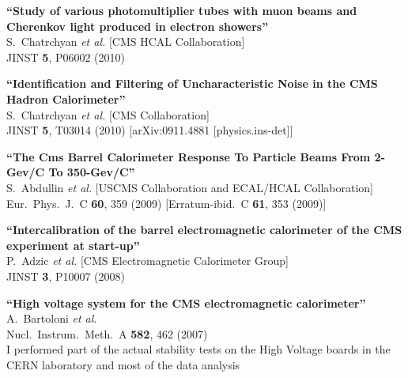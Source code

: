 \documentclass[10pt, a4paper]{article}
\begin{document}

\begin{thebibliography}{599}

{\bf ``Study of various photomultiplier tubes with muon beams and Cherenkov light produced in electron showers''}
  \\{}S.~Chatrchyan {\it et al.}  [CMS HCAL Collaboration]
  \\{}JINST {\bf 5}, P06002 (2010)

{\bf ``Identification and Filtering of Uncharacteristic Noise in the CMS Hadron Calorimeter''}
  \\{}S.~Chatrchyan {\it et al.}  [CMS Collaboration]
  \\{}JINST {\bf 5}, T03014 (2010)
  [arXiv:0911.4881 [physics.ins-det]]

{\bf ``The Cms Barrel Calorimeter Response To Particle Beams From 2-Gev/C To 350-Gev/C''}
  \\{}S.~Abdullin {\it et al.}  [USCMS Collaboration and ECAL/HCAL
                  Collaboration]
  \\{}Eur.\ Phys.\ J.\  C {\bf 60}, 359 (2009)
  [Erratum-ibid.\  C {\bf 61}, 353 (2009)]

{\bf ``Intercalibration of the barrel electromagnetic calorimeter of the CMS  experiment at start-up''}
  \\{}P.~Adzic {\it et al.}  [CMS Electromagnetic Calorimeter Group]
  \\{}JINST {\bf 3}, P10007 (2008)

{\bf ``High voltage system for the CMS electromagnetic calorimeter''}
  \\{}A.~Bartoloni {\it et al.}
  \\{}Nucl.\ Instrum.\ Meth.\  A {\bf 582}, 462 (2007)
  \\ I performed part of the actual stability tests on the High Voltage boards in the CERN laboratory and most of the data analysis 


\end{thebibliography}
\end{document}

